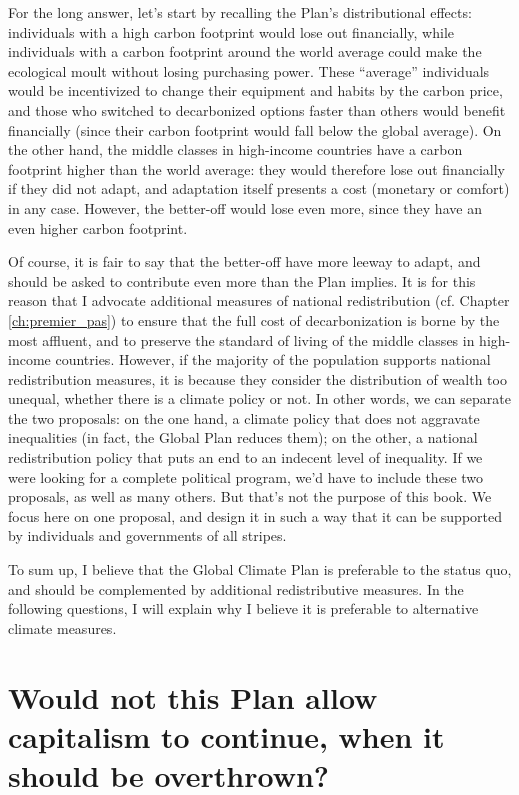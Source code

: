\documentclass[a5paper,english,openany]{memoir}
\begin{document}
For the long answer, let's start by recalling the Plan's distributional effects: individuals with a high carbon footprint would lose out financially, while individuals with a carbon footprint around the world average could make the ecological moult without losing purchasing power. These ``average'' individuals would be incentivized to change their equipment and habits by the carbon price, and those who switched to decarbonized options faster than others would benefit financially (since their carbon footprint would fall below the global average). On the other hand, the middle classes in high-income countries have a carbon footprint higher than the world average: they would therefore lose out financially if they did not adapt, and adaptation itself presents a cost (monetary or comfort) in any case. However, the better-off would lose even more, since they have an even higher carbon footprint. 

Of course, it is fair to say that the better-off have more leeway to adapt, and should be asked to contribute even more than the Plan implies. It is for this reason that I advocate additional measures of national redistribution (cf. Chapter \ref{ch:premier_pas}) to ensure that the full cost of decarbonization is borne by the most affluent, and to preserve the standard of living of the middle classes in high-income countries. However, if the majority of the population supports national redistribution measures, it is because they consider the distribution of wealth too unequal, whether there is a climate policy or not. In other words, we can separate the two proposals: on the one hand, a climate policy that does not aggravate inequalities (in fact, the Global Plan reduces them); on the other, a national redistribution policy that puts an end to an indecent level of inequality. If we were looking for a complete political program, we'd have to include these two proposals, as well as many others. But that's not the purpose of this book. We focus here on one proposal, and design it in such a way that it can be supported by individuals and governments of all stripes. 

To sum up, I believe that the Global Climate Plan is preferable to the status quo, and should be complemented by additional redistributive measures. In the following questions, I will explain why I believe it is preferable to alternative climate measures. 


\section*{\normalsize Would not this Plan allow capitalism to continue, when it should be overthrown?}\label{q:capitalism}
\end{document}
